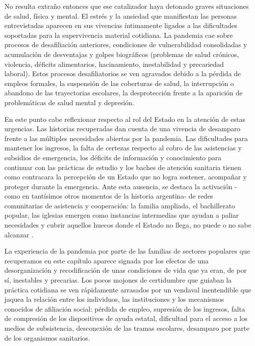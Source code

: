 \begin{refsection}
No resulta extraño entonces que ese catalizador haya detonado graves situaciones de salud, física y mental. El estrés y la ansiedad que manifiestan las personas entrevistadas aparecen en sus vivencias íntimamente ligados a las dificultades soportadas para la supervivencia material cotidiana. La pandemia cae sobre procesos de desafiliación anteriores, condiciones de vulnerabilidad consolidadas y acumulación de desventajas y golpes biográficos (problemas de salud crónicos, violencia, déficits alimentarios, hacinamiento, inestabilidad y precariedad laboral). Estos procesos desafiliatorios se ven agravados debido a la pérdida de empleos formales, la suspensión de las coberturas de salud, la interrupción o abandono de las trayectorias escolares, la desprotección frente a la aparición de problemáticas de salud mental y depresión.

En este punto cabe reflexionar respecto al rol del Estado en la atención de estas urgencias. Las historias recuperadas dan cuenta de una vivencia de desamparo frente a las múltiples necesidades abiertas por la pandemia. Las dificultades para mantener los ingresos, la falta de certezas respecto al cobro de las asistencias y subsidios de emergencia, los déficits de información y conocimiento para continuar con las prácticas de estudio y los baches de atención sanitaria tienen como contracara la percepción de un Estado que no logra sostener, acompañar y proteger durante la emergencia. Ante esta ausencia, se destaca la activación -como en tantísimos otros momentos de la historia argentina- de redes comunitarias de asistencia y cooperación: la familia ampliada, el bachillerato popular, las iglesias emergen como instancias intermedias que ayudan a paliar necesidades y cubrir aquellos huecos donde el Estado no llega, no puede o no sabe alcanzar \protect\parencite{4182-HEREDIA2022}.

La experiencia de la pandemia por parte de las familias de sectores populares que recuperamos en este capítulo aparece signada por los efectos de una desorganización y recodificación de unas condiciones de vida que ya eran, de por sí, inestables y precarias. Los pocos mojones de certidumbre que guiaban la práctica cotidiana se ven rápidamente arrasados por un vendaval inentendible que jaquea la relación entre los individuos, las instituciones y los mecanismos conocidos de afiliación social: pérdida de empleo, supresión de los ingresos, falta de compresión de los dispositivos de ayuda estatal, dificultad para el acceso a los medios de subsistencia, desconexión de las tramas escolares, desamparo por parte de los organismos sanitarios.


\end{refsection}
